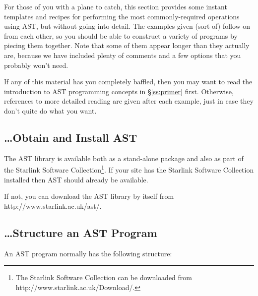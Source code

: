 \documentclass[twoside,11pt]{article}
\newcommand{\htmladdnormallink}[2]{#1}
\newcommand{\secref}[1]{\S\ref{#1}}
\newcommand{\secref}[1]{\ref{#1}}
\begin{document}
For those of you with a plane to catch, this section provides some
instant templates and recipes for performing the most
commonly-required operations using AST, but without going into
detail. The examples given (sort of) follow on from each other, so you
should be able to construct a variety of programs by piecing them
together.  Note that some of them appear longer than they actually
are, because we have included plenty of comments and a few options
that you probably won't need.

If any of this material has you completely baffled, then you may want
to read the introduction to AST programming concepts in
\secref{ss:primer} first. Otherwise, references to more detailed
reading are given after each example, just in case they don't quite do
what you want.

\subsection{\ldots Obtain and Install AST}
The AST library is available both as a stand-alone package and also as 
part of the Starlink Software Collection\footnote{The Starlink Software 
Collection can be downloaded from
\htmladdnormallink{http://www.starlink.ac.uk/Download/}
{http://www.starlink.ac.uk/Download/}.}. If your site has the Starlink
Software Collection installed then AST should already be available. 

If not, you can download the AST library by itself from
\htmladdnormallink{http://www.starlink.ac.uk/ast/}
{http://www.starlink.ac.uk/ast/}. 

\subsection{\ldots Structure an AST Program}

An AST program normally has the following structure:
\end{document}

